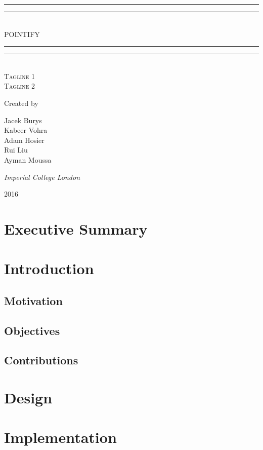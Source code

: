 \documentclass{article}
\newcommand*{\titleGP}{\begingroup %
\centering %
\vspace*{\baselineskip} %

\rule{\textwidth}{1.6pt}\vspace*{-\baselineskip}\vspace*{2pt} %
\rule{\textwidth}{0.4pt}\\[\baselineskip] %

{\LARGE POINTIFY}\\[0.2\baselineskip] %

\rule{\textwidth}{0.4pt}\vspace*{-\baselineskip}\vspace{3.2pt} %
\rule{\textwidth}{1.6pt}\\[\baselineskip] %

\scshape %
Tagline 1 \\ 
Tagline 2\par

\vspace*{2\baselineskip}

Created by \\[\baselineskip]
{\Large Jacek Burys \\ Kabeer Vohra \\ Adam Hosier \\ Rui Liu \\ Ayman Moussa \par} %

\vspace*{1\baselineskip}
{\itshape Imperial College London\par} %

\vfill 

{\scshape 2016} \\[0.3\baselineskip] %

\endgroup}
\begin{document}
 

\titleGP
\thispagestyle{empty}

\newpage
\tableofcontents
\thispagestyle{empty}

\newpage
\setcounter{page}{1}
\section{Executive Summary}

\newpage
\section{Introduction}
\subsection{Motivation}
\subsection{Objectives}
\subsection{Contributions}

\newpage
\section{Design}

\newpage
\section{Implementation}
\end{document}
